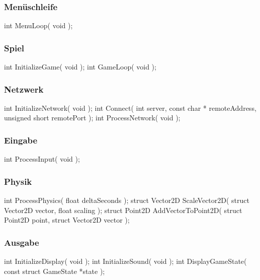 \documentclass{homework-pp}
\begin{document}
\subsubsection{Menüschleife}

\begin{cblock}
int MenuLoop( void );
\end{cblock}

\subsubsection{Spiel}

\begin{cblock}
int InitializeGame( void );
int GameLoop( void );
\end{cblock}

\subsubsection{Netzwerk}

\begin{cblock}
int InitializeNetwork( void );
int Connect( int 			server,
			 const char *	remoteAddress,
			 unsigned short	remotePort );
int ProcessNetwork( void );
\end{cblock}

\subsubsection{Eingabe}

\begin{cblock}
int ProcessInput( void );
\end{cblock}

\subsubsection{Physik}

\begin{cblock}
int ProcessPhysics( float deltaSeconds );
struct Vector2D ScaleVector2D( struct Vector2D vector,
							   float 		   scaling );
struct Point2D AddVectorToPoint2D( struct Point2D  point,
								   struct Vector2D vector );
\end{cblock}

\subsubsection{Ausgabe}

\begin{cblock}
int InitializeDisplay( void );
int InitializeSound( void );
int DisplayGameState( const struct GameState *state );
\end{cblock}
\end{document}
